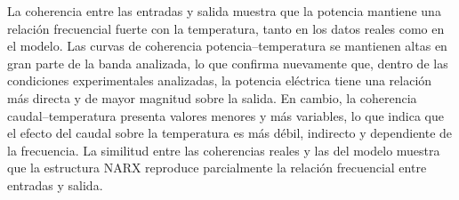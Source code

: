 \documentclass[11pt]{report}
\begin{document}
La coherencia entre las entradas y salida muestra que la potencia mantiene una relación frecuencial fuerte con la temperatura, tanto en los datos reales como en el modelo. Las curvas de coherencia potencia–temperatura se mantienen altas en gran parte de la banda analizada, lo que confirma nuevamente que, dentro de las condiciones experimentales analizadas, la potencia eléctrica tiene una relación más directa y de mayor magnitud sobre la salida. En cambio, la coherencia caudal–temperatura presenta valores menores y más variables, lo que indica que el efecto del caudal sobre la temperatura es más débil, indirecto y dependiente de la frecuencia. La similitud entre las coherencias reales y las del modelo muestra que la estructura NARX reproduce parcialmente la relación frecuencial entre entradas y salida.
\end{document}
